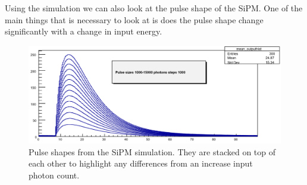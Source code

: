 

Using the simulation we can also look at the pulse shape of the SiPM. One of the main things that is necessary to look at is does the pulse shape change significantly with a change in input energy.

\begin{figure}
\centering
\includegraphics[width=\linewidth]{Figures/SimPul.png}
\caption{Pulse shapes from the SiPM simulation. They are stacked on top of each other to highlight any differences from an increase input photon count.}
\label{fig:SimPul}
\end{figure}


